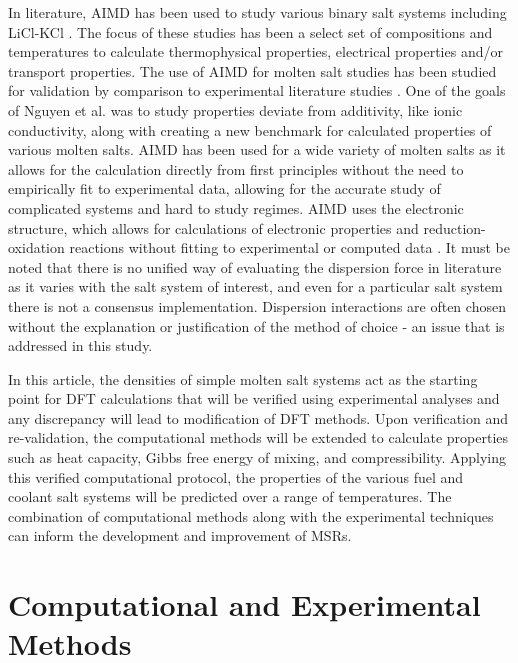 \documentclass[review]{elsarticle}
\begin{document}
In literature, AIMD has been used to study various binary salt systems including LiCl-KCl \cite{Bengston2014,NGUYEN2021}. The focus of these studies has been a select set of compositions and temperatures to calculate thermophysical properties, electrical properties and/or transport properties. The use of AIMD for molten salt studies has been studied for validation by comparison to experimental literature studies \cite{Bengston2014}. One of the goals of Nguyen et al. \cite{NGUYEN2021} was to study properties deviate from additivity, like ionic conductivity, along with creating a new benchmark for calculated properties of various molten salts. AIMD has been used for a wide variety of molten salts as it allows for the calculation directly from first principles without the need to empirically fit to experimental data, allowing for the accurate study of complicated systems and hard to study regimes. AIMD uses the electronic structure, which allows for calculations of electronic properties and reduction-oxidation reactions without fitting to experimental or computed data \cite{Bengston2014}. It must be noted that there is no unified way of evaluating the dispersion force in literature as it varies with the salt system of interest, and even for a particular salt system there is not a consensus implementation. Dispersion interactions are often chosen without the explanation or justification of the method of choice - an issue that is addressed in this study.

 In this article, the densities of simple molten salt systems act as the starting point for DFT calculations that will be verified using experimental analyses and any discrepancy will lead to modification of DFT methods. Upon verification and re-validation, the computational methods will be extended to calculate properties such as heat capacity, Gibbs free energy of mixing, and compressibility. Applying this verified computational protocol, the properties of the various fuel and coolant salt systems will be predicted over a range of temperatures. The combination of computational methods along with the experimental techniques can inform the development and improvement of MSRs. 


\section{Computational and Experimental Methods}
\end{document}
